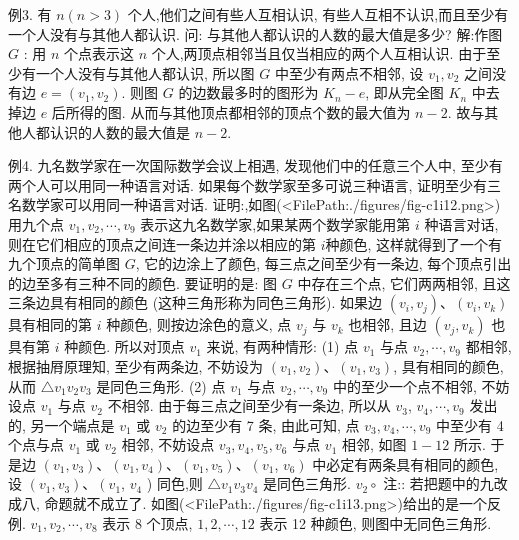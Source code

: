 例3. 有 $n(n>3)$ 个人,他们之间有些人互相认识, 有些人互相不认识,而且至少有一个人没有与其他人都认识.
问: 与其他人都认识的人数的最大值是多少?
解:作图 $G$ : 用 $n$ 个点表示这 $n$ 个人,两顶点相邻当且仅当相应的两个人互相认识.
由于至少有一个人没有与其他人都认识, 所以图 $G$ 中至少有两点不相邻, 设 $v_1, v_2$ 之间没有边 $e=\left(v_1, v_2\right)$. 则图 $G$ 的边数最多时的图形为 $K_n- e$, 即从完全图 $K_n$ 中去掉边 $e$ 后所得的图.
从而与其他顶点都相邻的顶点个数的最大值为 $n-2$. 故与其他人都认识的人数的最大值是 $n-2$.



例4. 九名数学家在一次国际数学会议上相遇, 发现他们中的任意三个人中, 至少有两个人可以用同一种语言对话.
如果每个数学家至多可说三种语言, 证明至少有三名数学家可以用同一种语言对话.
证明:,如图(<FilePath:./figures/fig-c1i12.png>)用九个点 $v_1, v_2, \cdots, v_9$ 表示这九名数学家,如果某两个数学家能用第 $i$ 种语言对话, 则在它们相应的顶点之间连一条边并涂以相应的第 $i$种颜色, 这样就得到了一个有九个顶点的简单图 $G$, 它的边涂上了颜色, 每三点之间至少有一条边, 每个顶点引出的边至多有三种不同的颜色.
要证明的是: 图 $G$ 中存在三个点, 它们两两相邻, 且这三条边具有相同的颜色 (这种三角形称为同色三角形).
如果边 $\left(v_i, v_j\right) 、\left(v_i, v_k\right)$ 具有相同的第 $i$ 种颜色, 则按边涂色的意义, 点 $v_j$ 与 $v_k$ 也相邻, 且边 $\left(v_j, v_k\right)$ 也具有第 $i$ 种颜色.
所以对顶点 $v_1$ 来说, 有两种情形:
(1) 点 $v_1$ 与点 $v_2, \cdots, v_9$ 都相邻, 根据抽㞕原理知, 至少有两条边, 不妨设为 $\left(v_1, v_2\right) 、\left(v_1, v_3\right)$, 具有相同的颜色, 从而 $\triangle v_1 v_2 v_3$ 是同色三角形.
(2) 点 $v_1$ 与点 $v_2, \cdots, v_9$ 中的至少一个点不相邻, 不妨设点 $v_1$ 与点 $v_2$
不相邻.
由于每三点之间至少有一条边, 所以从 $v_3$, $v_4, \cdots, v_9$ 发出的, 另一个端点是 $v_1$ 或 $v_2$ 的边至少有 7 条, 由此可知, 点 $v_3, v_4, \cdots, v_9$ 中至少有 4 个点与点 $v_1$ 或 $v_2$ 相邻, 不妨设点 $v_3, v_4, v_5, v_6$ 与点 $v_1$ 相邻, 如图 $1-12$ 所示.
于是边 $\left(v_1, v_3\right) 、\left(v_1, v_4\right) 、\left(v_1, v_5\right) 、\left(v_1\right.$, $\left.v_6\right)$ 中必定有两条具有相同的颜色, 设 $\left(v_1, v_3\right) 、\left(v_1\right.$, $v_4$ ) 同色,则 $\triangle v_1 v_3 v_4$ 是同色三角形.
$v_2 \circ$
注:: 若把题中的九改成八, 命题就不成立了.
如图(<FilePath:./figures/fig-c1i13.png>)给出的是一个反例.
$v_1, v_2, \cdots, v_8$ 表示 8 个顶点, $1,2, \cdots, 12$ 表示 12 种颜色, 则图中无同色三角形.



